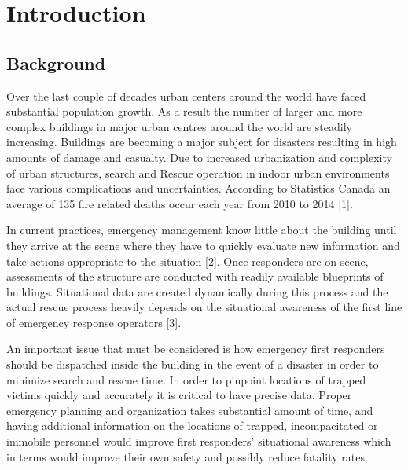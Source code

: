 %


\setcounter{section}{0}
\section{Introduction}
\bigskip
\subsection{Background}
Over the last couple of decades urban centers around the world have faced substantial population growth. As a result the number of larger and more complex buildings in major urban centres around the world are steadily increasing. Buildings are becoming a major subject for disasters resulting in high amounts of damage and casualty. Due to increased urbanization and complexity of urban structures, search and Rescue operation in indoor urban environments face various complications and uncertainties. According to Statistics Canada an average of 135 fire related deaths occur each year from 2010 to 2014 [1].

\bigskip
In current practices, emergency management know little about the building until they arrive at the scene where they have to quickly evaluate new information and take actions appropriate to the situation [2]. Once responders are on scene, assessments of the structure are conducted with readily available blueprints of buildings. Situational data are created dynamically during this process and the actual rescue process heavily depends on the situational awareness of the first line of emergency response operators [3].

\bigskip
An important issue that must be considered is how emergency first responders should be dispatched inside the building in the event of a disaster in order to minimize search and rescue time. In order to pinpoint locations of trapped victims quickly and accurately it is critical to have precise data. Proper emergency planning and organization takes substantial amount of time, and having additional information on the locations of trapped, incompacitated or immobile personnel would improve first responders’ situational awareness which in terms would improve their own safety and possibly reduce fatality rates.

